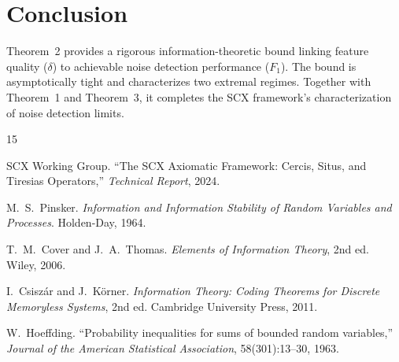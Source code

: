\documentclass[12pt,a4paper]{article}
\begin{document}
\section{Conclusion}

Theorem~2 provides a rigorous information-theoretic bound linking feature quality ($\delta$) to achievable noise detection performance ($F_1$). The bound is asymptotically tight and characterizes two extremal regimes. Together with Theorem~1 and Theorem~3, it completes the \textsf{SCX} framework's characterization of noise detection limits.


\begin{thebibliography}{15}

SCX Working Group.
\newblock ``The \textsf{SCX} Axiomatic Framework: Cercis, Situs, and Tiresias Operators,''
\newblock \emph{Technical Report}, 2024.

M.~S.~Pinsker.
\newblock \emph{Information and Information Stability of Random Variables and Processes}.
\newblock Holden-Day, 1964.

T.~M.~Cover and J.~A.~Thomas.
\newblock \emph{Elements of Information Theory}, 2nd ed.
\newblock Wiley, 2006.

I.~Csisz\'ar and J.~K\"orner.
\newblock \emph{Information Theory: Coding Theorems for Discrete Memoryless Systems}, 2nd ed.
\newblock Cambridge University Press, 2011.

W.~Hoeffding.
\newblock ``Probability inequalities for sums of bounded random variables,''
\newblock \emph{Journal of the American Statistical Association}, 58(301):13--30, 1963.

\end{thebibliography}
\end{document}

